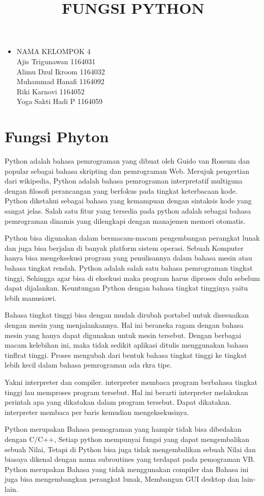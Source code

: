 \documentclass[12pt,a4paper]{article}
\begin{document}
\title{FUNGSI PYTHON}
\maketitle

\begin{itemize}
\item
NAMA KELOMPOK 4\\
Ajis Trigunawan			1164031\\
Alimu Dzul Ikroom		1164032\\
Muhammad Hanafi			1164092\\
Riki Karnovi			1164052\\
Yoga Sakti Hadi P		1164059\\
\end{itemize}

\section{Fungsi Phyton}
Python adalah bahasa pemrograman yang dibuat oleh Guido van Rossum dan popular sebagai bahasa skripting dan pemrograman Web. Merujuk pengertian dari wikipedia, Python adalah bahasa pemrograman interpretatif multiguna dengan filosofi perancangan yang berfokus pada tingkat keterbacaan kode. Python diketahui sebagai bahasa yang kemampuan dengan sintaksis kode yang sangat jelas. Salah satu fitur yang tersedia pada python adalah sebagai bahasa pemrograman dinamis yang dilengkapi dengan manajemen memori otomatis.

Python bisa digunakan dalam bermacam-macam pengembangan perangkat lunak dan juga bisa berjalan di banyak platform sistem operasi. Sebuah Komputer hanya bisa mengeksekusi program yang penulisannya dalam bahasa mesin atau bahasa tingkat rendah. Python adalah salah satu bahasa pemrograman tingkat tinggi, Sehingga agar bisa di eksekusi maka program harus diproses dulu sebelum dapat dijalankan. Keuntungan Python dengan bahasa tingkat tingginya yaitu lebih manusiawi.

Bahasa tingkat tinggi bisa dengan mudah dirubah portabel untuk disesuaikan dengan mesin yang menjalankannya. Hal ini beraneka ragam dengan bahasa mesin yang hanya dapat digunakan untuk mesin tersebut. Dengan berbagai macam kelebihan ini, maka tidak sedikit aplikasi ditulis menggunakan bahasa tinﬂrat tinggi. Proses mengubah dari bentuk bahasa tingkat tinggi ke tingkat lebih kecil dalam bahasa pemrograman ada rkra tipe.

Yakni interpreter dan compiler. interpreter membaca program berbahasa tingkat tinggi lau memproses program tersebut. Hal ini berarti interpreter melakukan perintah apa yang dikatakan dalam program tersebut. Dapat dikatakan. interpreter membaca per baris kemudian mengeksekusinya. 

Python merupakan Bahasa pemograman yang hampir tidak bisa dibedakan dengan C/C++, Setiap python mempunyai fungsi yang dapat mengembalikan sebuah Nilai, Tetapi di Python  bisa juga  tidak mengembalikan sebuah Nilai dan biasaya dikenal dengan nama subroutines yang terdapat pada pemograman VB. Python merupakan Bahasa yang tidak menggunakan compiler dan Bahasa ini juga bisa mengembangkan perangkat lunak, Membangun GUI desktop dan lain-lain.
\end{document}
